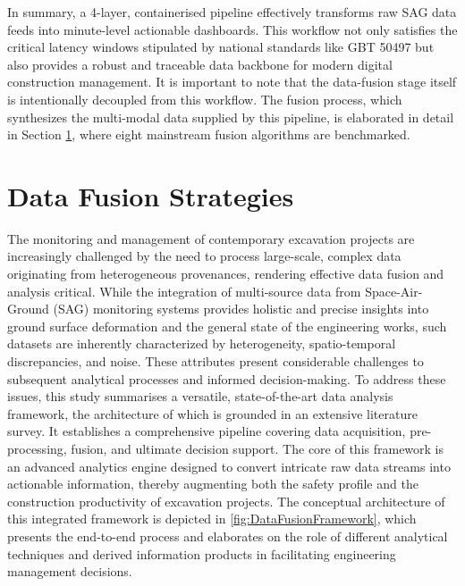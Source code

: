 \documentclass[preprint,11pt,authoryear,3p]{elsarticle}
\begin{document}
In summary, a 4-layer, containerised pipeline effectively transforms raw SAG data feeds into minute-level actionable dashboards. This workflow not only satisfies the critical latency windows stipulated by national standards like GBT 50497 but also provides a robust and traceable data backbone for modern digital construction management. It is important to note that the data-fusion stage itself is intentionally decoupled from this workflow. The fusion process, which synthesizes the multi-modal data supplied by this pipeline, is elaborated in detail in Section \ref{sec.fusion}, where eight mainstream fusion algorithms are benchmarked.


\section{Data Fusion Strategies}\label{sec.fusion}

The monitoring and management of contemporary excavation projects are increasingly challenged by the need to process large-scale, complex data originating from heterogeneous provenances, rendering effective data fusion and analysis critical. While the integration of multi-source data from Space-Air-Ground (SAG) monitoring systems provides holistic and precise insights into ground surface deformation and the general state of the engineering works, such datasets are inherently characterized by heterogeneity, spatio-temporal discrepancies, and noise. These attributes present considerable challenges to subsequent analytical processes and informed decision-making. To address these issues, this study summarises a versatile, state-of-the-art data analysis framework, the architecture of which is grounded in an extensive literature survey. It establishes a comprehensive pipeline covering data acquisition, pre-processing, fusion, and ultimate decision support. The core of this framework is an advanced analytics engine designed to convert intricate raw data streams into actionable information, thereby augmenting both the safety profile and the construction productivity of excavation projects. The conceptual architecture of this integrated framework is depicted in \autoref{fig:DataFusionFramework}, which presents the end-to-end process and elaborates on the role of different analytical techniques and derived information products in facilitating engineering management decisions.
\end{document}
